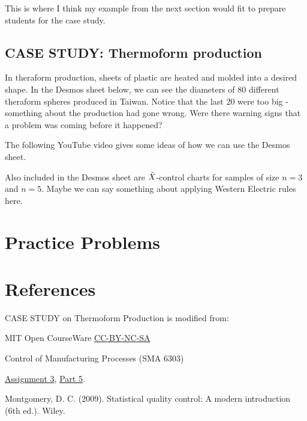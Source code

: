 \documentclass{ximera}
\begin{document}
This is where I think my example from the next section would fit to prepare students for the case study.

\subsection*{CASE STUDY: Thermoform production}

In theraform production, sheets of plastic are heated and molded into a desired shape.  In the Desmos sheet below, we can see the diameters of 80 different theraform spheres produced in Taiwan.  Notice that the last 20 were too big - something about the production had gone wrong.  Were there warning signs that a problem was coming before it happened?


The following YouTube video gives some ideas of how we can use the Desmos sheet.


Also included in the Desmos sheet are $\Bar{X}$-control charts for samples of size $n=3$ and $n=5$.  Maybe we can say something about applying Western Electric rules here.

\section*{Practice Problems}

\section*{References}

CASE STUDY on Thermoform Production is modified from:

MIT Open CourseWare \href{https://creativecommons.org/licenses/by-nc-sa/4.0/}{CC-BY-NC-SA}

Control of Manufacturing Processes (SMA 6303)

\href{https://ocw.mit.edu/courses/2-830j-control-of-manufacturing-processes-sma-6303-spring-2008/resources/ps3/}{Assignment 3}, \href{https://ocw.mit.edu/courses/2-830j-control-of-manufacturing-processes-sma-6303-spring-2008/resources/35/}{Part 5}. 

Montgomery, D. C. (2009). Statistical quality control: A modern introduction (6th ed.). Wiley.
\end{document}
